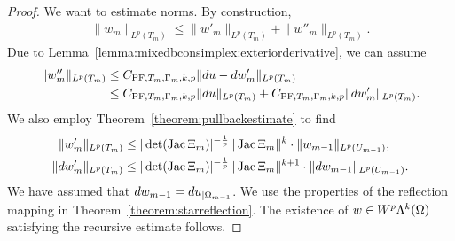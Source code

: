 \documentclass[10pt,letterpaper]{article}
\begin{document}
\begin{proof}
    We want to estimate norms. 
    By construction,
    \begin{align*}
        \| w_{m} \|_{L^{p}(T_{m})}
        \leq  
        \| w'_{m} \|_{L^{p}(T_{m})}
        + 
        \| w''_{m} \|_{L^{p}(T_{m})}
        .
    \end{align*}
    Due to Lemma~\ref{lemma:mixedbconsimplex:exteriorderivative},
    we can assume 
    \begin{align*}
        \| w''_{m} \|_{L^{p}(T_{m})} 
        &
        \leq 
        C_{{\rm PF},T_{m},\Gamma_{m},k,p} \| d u - d w'_{m} \|_{L^{p}(T_{m})}
        \\&
        \leq 
        C_{{\rm PF},T_{m},\Gamma_{m},k,p} \| d u      \|_{L^{p}(T_{m})} 
        + 
        C_{{\rm PF},T_{m},\Gamma_{m},k,p} \| d w'_{m} \|_{L^{p}(T_{m})} 
        .
    \end{align*}
    We also employ Theorem~\ref{theorem:pullbackestimate} to find 
    \begin{align*}
        \| w'_{m} \|_{L^{p}(T_{m})}
        &\leq 
        |\det(\operatorname{{\rm Jac}} \Xi_{m}  )|^{-\frac 1 p} 
        \| \operatorname{{\rm Jac}} \Xi_{m} \|^{k}
        \cdot 
        \| w_{m-1} \|_{L^{p}(U_{m-1})}
        ,
        \\
        \| d w'_{m} \|_{L^{p}(T_{m})}
        &\leq 
        |\det(\operatorname{{\rm Jac}} \Xi_{m}  )|^{-\frac 1 p} 
        \| \operatorname{{\rm Jac}} \Xi_{m} \|^{k+1}
        \cdot 
        \| d w_{m-1} \|_{L^{p}(U_{m-1})}
        .
    \end{align*}
    We have assumed that $d w_{m-1} = d u_{|\Omega_{m-1}}$. 
    We use the properties of the reflection mapping in Theorem~\ref{theorem:starreflection}. 
    The existence of $w \in W^{p}\Lambda^{k}(\Omega)$ satisfying the recursive estimate follows. 
\end{proof}
\end{document}
